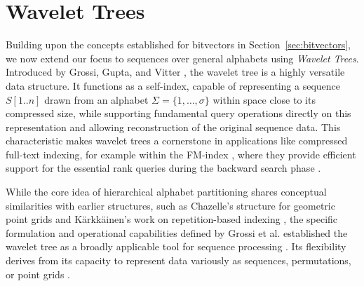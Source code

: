 \clearpage
\section{Wavelet Trees} \label{sec:wavelet_trees}

Building upon the concepts established for bitvectors in Section~\ref{sec:bitvectors}, we now extend our focus to sequences over general alphabets using \emph{Wavelet Trees}. Introduced by Grossi, Gupta, and Vitter \cite{GrossiWT2003}, the wavelet tree is a highly versatile data structure. It functions as a self-index, capable of representing a sequence $S[1..n]$ drawn from an alphabet $\Sigma = \{1, \dots, \sigma\}$ within space close to its compressed size, while supporting fundamental query operations directly on this representation and allowing reconstruction of the original sequence data. This characteristic makes wavelet trees a cornerstone in applications like compressed full-text indexing, for example within the FM-index \cite{ferragina2000opportunistic}, where they provide efficient support for the essential \textsf{rank} queries during the backward search phase \cite{WTForALL}.

While the core idea of hierarchical alphabet partitioning shares conceptual similarities with earlier structures, such as Chazelle's structure for geometric point grids \cite{Chazelle1988} and Kärkkäinen's work on repetition-based indexing \cite{karkkainen1999repetition}, the specific formulation and operational capabilities defined by Grossi et al. \cite{GrossiWT2003} established the wavelet tree as a broadly applicable tool for sequence processing \cite{WTForALL}. Its flexibility derives from its capacity to represent data variously as sequences, permutations, or point grids \cite{WTForALL, WTFromTheoryToPractice, TheMyriadVirtuesWT}.


